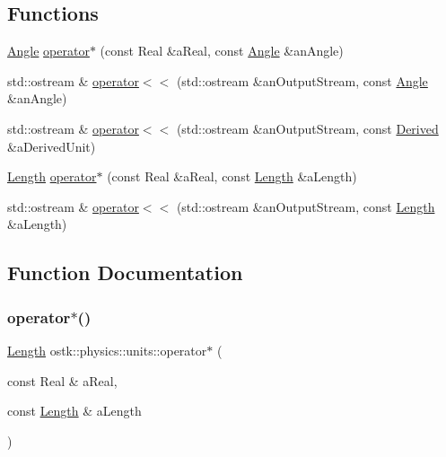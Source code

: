 \subsection*{Functions}
\begin{DoxyCompactItemize}
\item 
\hyperlink{classostk_1_1physics_1_1units_1_1_angle}{Angle} \hyperlink{namespaceostk_1_1physics_1_1units_ad1643ff392ba66b2db744efcdec31141}{operator$\ast$} (const Real \&a\+Real, const \hyperlink{classostk_1_1physics_1_1units_1_1_angle}{Angle} \&an\+Angle)
\item 
std\+::ostream \& \hyperlink{namespaceostk_1_1physics_1_1units_a0fc91bc012e2d19265e3d0aec1bf61c7}{operator$<$$<$} (std\+::ostream \&an\+Output\+Stream, const \hyperlink{classostk_1_1physics_1_1units_1_1_angle}{Angle} \&an\+Angle)
\item 
std\+::ostream \& \hyperlink{namespaceostk_1_1physics_1_1units_afd67c078221ddcb91dc4765629f483d8}{operator$<$$<$} (std\+::ostream \&an\+Output\+Stream, const \hyperlink{classostk_1_1physics_1_1units_1_1_derived}{Derived} \&a\+Derived\+Unit)
\item 
\hyperlink{classostk_1_1physics_1_1units_1_1_length}{Length} \hyperlink{namespaceostk_1_1physics_1_1units_a8180734bd1ecd74b130a47c53523b3d9}{operator$\ast$} (const Real \&a\+Real, const \hyperlink{classostk_1_1physics_1_1units_1_1_length}{Length} \&a\+Length)
\item 
std\+::ostream \& \hyperlink{namespaceostk_1_1physics_1_1units_a3f35dd2b35b92d59a3f53c8dd29bec78}{operator$<$$<$} (std\+::ostream \&an\+Output\+Stream, const \hyperlink{classostk_1_1physics_1_1units_1_1_length}{Length} \&a\+Length)
\end{DoxyCompactItemize}


\subsection{Function Documentation}
\mbox{\label{namespaceostk_1_1physics_1_1units_a8180734bd1ecd74b130a47c53523b3d9}} 
\subsubsection{\texorpdfstring{operator$\ast$()}{operator*()}\hspace{0.1cm}{\footnotesize\ttfamily [1/2]}}
{\footnotesize\ttfamily \hyperlink{classostk_1_1physics_1_1units_1_1_length}{Length} ostk\+::physics\+::units\+::operator$\ast$ (\begin{DoxyParamCaption}\item[{const Real \&}]{a\+Real,  }\item[{const \hyperlink{classostk_1_1physics_1_1units_1_1_length}{Length} \&}]{a\+Length }\end{DoxyParamCaption})}

